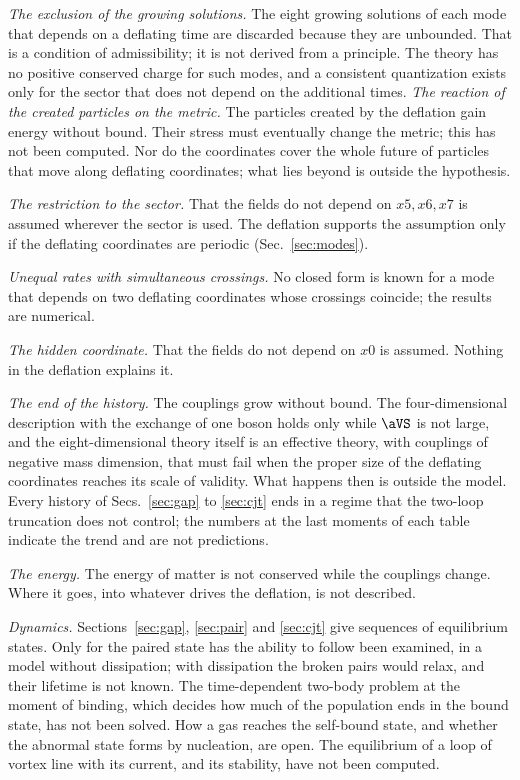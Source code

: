 \emph{The exclusion of the growing solutions.} The eight growing solutions of each mode that depends
on a deflating time are discarded because they are unbounded. That is a condition of admissibility;
it is not derived from a principle. The theory has no positive conserved charge for such modes, and
a consistent quantization exists only for the sector that does not depend on the additional times.
\emph{The reaction of the created particles on the metric.} The particles created by the deflation
gain energy without bound. Their stress must eventually change the metric; this has not been
computed. Nor do the coordinates cover the whole future of particles that move along deflating
coordinates; what lies beyond is outside the hypothesis.

\emph{The restriction to the sector.} That the fields do not depend on $x5,x6,x7$ is assumed
wherever the sector is used. The deflation supports the assumption only if the deflating coordinates
are periodic (Sec.~\ref{sec:modes}).

\emph{Unequal rates with simultaneous crossings.} No closed form is known for a mode that depends on
two deflating coordinates whose crossings coincide; the results are numerical.

\emph{The hidden coordinate.} That the fields do not depend on $x0$ is assumed. Nothing in the
deflation explains it.

\emph{The end of the history.} The couplings grow without bound. The four-dimensional description
with the exchange of one boson holds only while $\aVS$ is not large, and the eight-dimensional theory
itself is an effective theory, with couplings of negative mass dimension, that must fail when the
proper size of the deflating coordinates reaches its scale of validity. What happens then is outside
the model. Every history of Secs.~\ref{sec:gap} to \ref{sec:cjt} ends in a regime that the two-loop
truncation does not control; the numbers at the last moments of each table indicate the trend and
are not predictions.

\emph{The energy.} The energy of matter is not conserved while the couplings change. Where it goes,
into whatever drives the deflation, is not described.

\emph{Dynamics.} Sections~\ref{sec:gap}, \ref{sec:pair} and \ref{sec:cjt} give sequences of
equilibrium states. Only for the paired state has the ability to follow been examined, in a model
without dissipation; with dissipation the broken pairs would relax, and their lifetime is not known.
The time-dependent two-body problem at the moment of binding, which decides how much of the
population ends in the bound state, has not been solved. How a gas reaches the self-bound state, and
whether the abnormal state forms by nucleation, are open. The equilibrium of a loop of vortex line
with its current, and its stability, have not been computed.

